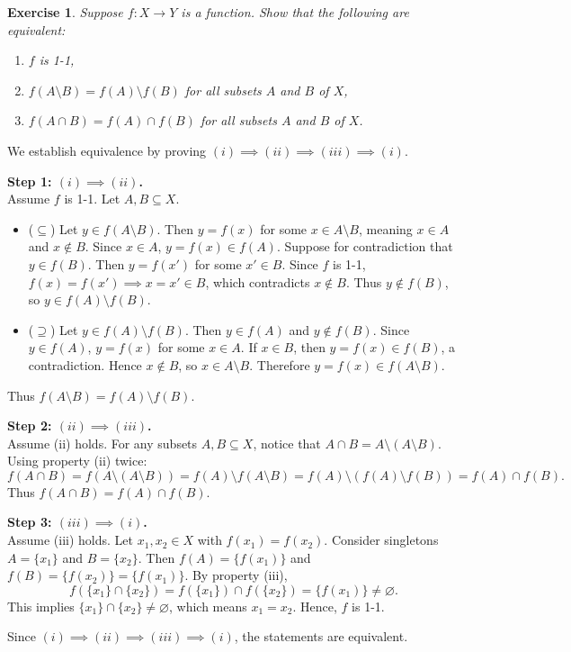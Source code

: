 \documentclass[12pt, a4paper]{article}
\makeatletter
\theoremstyle{break}
\newtheorem{exerciseitem}{Exercise}[section]
\newenvironment{exercise}
  {\begin{exerciseitem}\addcontentsline{toc}{subsection}{Exercise~\theexerciseitem}}
  {\end{exerciseitem}}
\renewenvironment{proof}[1][\proofname]{\par
  \pushQED{\qed}%
  \normalfont \topsep6\p@\@plus6\p@\relax
  \trivlist
  \item[\hskip\labelsep\bfseries #1\@addpunct{.}]\mbox{}\newline\ignorespaces
}{%
  \popQED\endtrivlist\@endpefalse
}
\newenvironment{solution}{\begin{proof}[Solution]}{\end{proof}}
\makeatother
\begin{document}
\begin{exercise}\label{e1.18}
Suppose \(f : X \to Y\) is a function. Show that the following are equivalent:
\begin{enumerate}[label=(\roman*)]
    \item \(f\) is 1-1,
    \item \(f(A \setminus B) = f(A) \setminus f(B)\) for all subsets \(A\) and \(B\) of \(X\),
    \item \(f(A \cap B) = f(A) \cap f(B)\) for all subsets \(A\) and \(B\) of \(X\).
\end{enumerate}
\end{exercise}

\begin{solution}
We establish equivalence by proving \((i) \implies (ii) \implies (iii) \implies (i)\).

\textbf{Step 1: \((i) \implies (ii)\).} \\
Assume \(f\) is 1-1. Let \(A, B \subseteq X\).
\begin{itemize}
    \item (\(\subseteq\)) Let \(y \in f(A \setminus B)\). Then \(y = f(x)\) for some \(x \in A \setminus B\), meaning \(x \in A\) and \(x \notin B\). 
    Since \(x \in A\), \(y = f(x) \in f(A)\). 
    Suppose for contradiction that \(y \in f(B)\). Then \(y = f(x')\) for some \(x' \in B\). Since \(f\) is 1-1, \(f(x) = f(x') \implies x = x' \in B\), which contradicts \(x \notin B\). Thus \(y \notin f(B)\), so \(y \in f(A) \setminus f(B)\).
    \item (\(\supseteq\)) Let \(y \in f(A) \setminus f(B)\). Then \(y \in f(A)\) and \(y \notin f(B)\). 
    Since \(y \in f(A)\), \(y = f(x)\) for some \(x \in A\). If \(x \in B\), then \(y = f(x) \in f(B)\), a contradiction. Hence \(x \notin B\), so \(x \in A \setminus B\). Therefore \(y = f(x) \in f(A \setminus B)\).
\end{itemize}
Thus \(f(A \setminus B) = f(A) \setminus f(B)\).

\textbf{Step 2: \((ii) \implies (iii)\).} \\
Assume (ii) holds. For any subsets \(A, B \subseteq X\), notice that \(A \cap B = A \setminus (A \setminus B)\).
Using property (ii) twice:
\[
f(A \cap B) = f(A \setminus (A \setminus B)) = f(A) \setminus f(A \setminus B) = f(A) \setminus (f(A) \setminus f(B)) = f(A) \cap f(B).
\]
Thus \(f(A \cap B) = f(A) \cap f(B)\).

\textbf{Step 3: \((iii) \implies (i)\).} \\
Assume (iii) holds. Let \(x_1, x_2 \in X\) with \(f(x_1) = f(x_2)\). 
Consider singletons \(A = \{x_1\}\) and \(B = \{x_2\}\). 
Then \(f(A) = \{f(x_1)\}\) and \(f(B) = \{f(x_2)\} = \{f(x_1)\}\). 
By property (iii),
\[
f(\{x_1\} \cap \{x_2\}) = f(\{x_1\}) \cap f(\{x_2\}) = \{f(x_1)\} \neq \varnothing.
\]
This implies \(\{x_1\} \cap \{x_2\} \neq \varnothing\), which means \(x_1 = x_2\). 
Hence, \(f\) is 1-1.

Since \((i) \implies (ii) \implies (iii) \implies (i)\), the statements are equivalent.
\end{solution}
\end{document}
